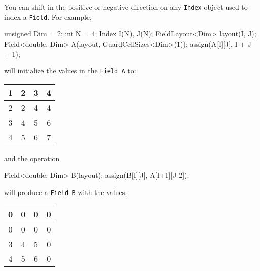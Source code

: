 You can shift in the positive or negative direction on any \texttt{Index} object used to index a \texttt{Field}. For example, \\
\begin{code}
unsigned Dim = 2;
int N = 4;
Index I(N), J(N);
FieldLayout<Dim> layout(I, J);
Field<double, Dim> A(layout, GuardCellSizes<Dim>(1));
assign(A[I][J], I + J + 1);
\end{code}
will initialize the values in the \texttt{Field A} to:
%
   \begin{center}
        \begin{tabular}{|c|c|c|c|}
        \hline
        1 & 2 & 3 & 4 \\        \hline
        2 & 2 & 4 & 4 \\        \hline
        3 & 4 & 5 & 6 \\        \hline
        4 & 5 & 6 & 7 \\        \hline
        \end{tabular}
   \label{tbl:t2}
   \end{center}
%
and the operation
\begin{smallcode}
Field<double, Dim> B(layout);
assign(B[I][J], A[I+1][J-2]);
\end{smallcode}
will produce a \texttt{Field B} with the values:
%
   \begin{center}
        \begin{tabular}{|c|c|c|c|}
        \hline
        0 & 0 & 0 & 0 \\        \hline
        0 & 0 & 0 & 0 \\        \hline
        3 & 4 & 5 & 0 \\        \hline
        4 & 5 & 6 & 0 \\        \hline
        \end{tabular}
   \end{center}

\subsection{}

